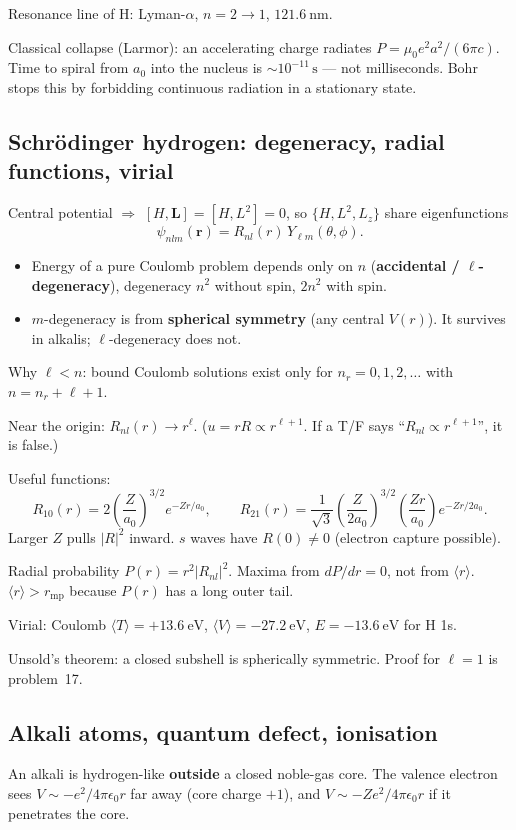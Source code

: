 \documentclass[11pt,a4paper]{article}
\begin{document}
Resonance line of H: Lyman-\(\alpha\), \(n=2\to 1\), \(121.6~\mathrm{nm}\).

Classical collapse (Larmor): an accelerating charge radiates \(P=\mu_0 e^2 a^2/(6\pi c)\). Time to spiral from \(a_0\) into the nucleus is \(\sim 10^{-11}\,\mathrm{s}\) --- not milliseconds. Bohr stops this by forbidding continuous radiation in a stationary state.

\subsection{Schr\"odinger hydrogen: degeneracy, radial functions, virial}
Central potential \(\Rightarrow\) \([H,\mathbf{L}]=[H,L^2]=0\), so \(\{H,L^2,L_z\}\) share eigenfunctions
\[
\psi_{nlm}(\mathbf{r})=R_{nl}(r)\,Y_{\ell m}(\theta,\phi).
\]
\begin{itemize}
\item Energy of a pure Coulomb problem depends only on \(n\) (\textbf{accidental / \(\ell\)-degeneracy}), degeneracy \(n^2\) without spin, \(2n^2\) with spin.
\item \(m\)-degeneracy is from \textbf{spherical symmetry} (any central \(V(r)\)). It survives in alkalis; \(\ell\)-degeneracy does not.
\end{itemize}
Why \(\ell<n\): bound Coulomb solutions exist only for \(n_r=0,1,2,\ldots\) with \(n=n_r+\ell+1\).

Near the origin: \(R_{nl}(r)\to r^{\ell}\). (\(u=rR\propto r^{\ell+1}\). If a T/F says ``\(R_{nl}\propto r^{\ell+1}\)'', it is false.)

Useful functions:
\[
R_{10}(r)=2\left(\frac{Z}{a_0}\right)^{3/2}e^{-Zr/a_0},\qquad
R_{21}(r)=\frac{1}{\sqrt{3}}\left(\frac{Z}{2a_0}\right)^{3/2}\left(\frac{Zr}{a_0}\right)e^{-Zr/2a_0}.
\]
Larger \(Z\) pulls \(|R|^2\) inward. \(s\) waves have \(R(0)\neq 0\) (electron capture possible).

Radial probability \(P(r)=r^2|R_{nl}|^2\). Maxima from \(dP/dr=0\), not from \(\langle r\rangle\). \(\langle r\rangle>r_{\mathrm{mp}}\) because \(P(r)\) has a long outer tail.

Virial: Coulomb \(\langle T\rangle=+13.6~\mathrm{eV}\), \(\langle V\rangle=-27.2~\mathrm{eV}\), \(E=-13.6~\mathrm{eV}\) for H 1s.

Unsold's theorem: a closed subshell is spherically symmetric. Proof for \(\ell=1\) is problem~17.

\subsection{Alkali atoms, quantum defect, ionisation}
An alkali is hydrogen-like \textbf{outside} a closed noble-gas core. The valence electron sees \(V\sim -e^2/4\pi\epsilon_0 r\) far away (core charge \(+1\)), and \(V\sim -Ze^2/4\pi\epsilon_0 r\) if it penetrates the core.
\end{document}
